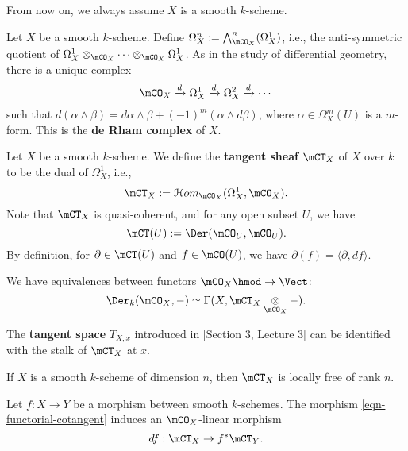 	From now on, we always assume $X$ is a smooth $k$-scheme.

	\begin{constr}
		Let $X$ be a smooth $k$-scheme. Define $\Omega_X^n:=\bigwedge_{\mCO_X}^n (\Omega_X^1)$, i.e., the anti-symmetric quotient of $\Omega_X^1 \ot_{\mCO_X} \cdots \ot_{\mCO_X} \Omega_X^1$. As in the study of differential geometry, there is a unique complex
		\[
			\mCO_X \xrightarrow{d} \Omega_X^1 \xrightarrow{d} \Omega_X^2 \xrightarrow{d} \cdots
		\]
		such that $d(\alpha\wedge \beta) = d\alpha\wedge \beta + (-1)^m (\alpha\wedge d\beta)$, where $\alpha\in \Omega_X^m(U)$ is a $m$-form. This is the \textbf{de Rham complex} of $X$.

	\end{constr}

	\begin{constr}
		Let $X$ be a smooth $k$-scheme. We define the \textbf{tangent sheaf} $\mCT_{X}$ of $X$ over $k$ to be the dual of $\Omega^1_{X}$, i.e., 
		\[
			\mCT_{X} := \mathcal{H}om_{\mCO_X}( \Omega^1_{X},\mCO_X ).
		\]
		Note that $\mCT_{X}$ is quasi-coherent, and for any open subset $U$, we have
		\[
			\mCT(U):= \Der( \mCO_U, \mCO_U).
		\]
		By definition, for $\partial\in \mCT(U)$ and $f\in \mCO(U)$, we have $\partial(f) = \langle \partial, df\rangle$.
	\end{constr}

	\begin{cor}
		\label{cor-der-tensor}
		We have equivalences between functors $\mCO_X\hmod \to \Vect$:
		\[
			\Der_k(\mCO_X,-) \simeq \Gamma(X, \mCT_X \ot_{\mCO_X} - ).
		\]
	\end{cor}

	\begin{rem}
		The \textbf{tangent space} $T_{X,x}$ introduced in [Section 3, Lecture 3] can be identified with the stalk of $\mCT_{X}$ at $x$.
	\end{rem}

	\begin{cor}
		If $X$ is a smooth $k$-scheme of dimension $n$, then $\mCT_{X}$ is locally free of rank $n$.
	\end{cor}

	

	\begin{constr}
		Let $f:X\to Y$ be a morphism between smooth $k$-schemes. The morphism \eqref{eqn-functorial-cotangent} induces an $\mCO_X$-linear morphism
		\[
			df: \mCT_{X}\to f^*\mCT_{Y}.
		\]

	\end{constr}

